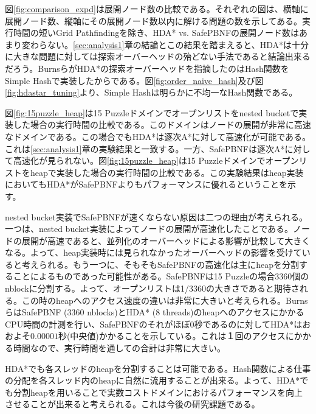 \documentclass[uplatex]{jsarticle}
\begin{document}
図\ref{fig:comparison_expd}は展開ノード数の比較である。それぞれの図は、横軸に展開ノード数、縦軸にその展開ノード数以内に解ける問題の数を示してある。実行時間の短いGrid Pathfindingを除き、HDA* vs. SafePBNFの展開ノード数はあまり変わらない。\ref{sec:analysis1}章の結論とこの結果を踏まえると、HDA*は十分に大きな問題に対しては探索オーバーヘッドの殆どない手法であると結論出来るだろう。BurnsらがHDA*の探索オーバーヘッドを指摘したのはHash関数をSimple Hashで実装したからである。図\ref{fig:order_naive_hash}及び図\ref{fig:hdastar_tuning}より、Simple Hashは明らかに不均一なHash関数である。

図\ref{fig:15puzzle_heap}は15 Puzzleドメインでオープンリストをnested bucketで実装した場合の実行時間の比較である。このドメインはノードの展開が非常に高速なドメインである。この場合でもHDA*は逐次A*に対して高速化が可能である。これは\ref{sec:analysis1}章の実験結果と一致する。一方、SafePBNFは逐次A*に対して高速化が見られない。図\ref{fig:15puzzle_heap}は15 Puzzleドメインでオープンリストをheapで実装した場合の実行時間の比較である。この実験結果はheap実装においてもHDA*がSafePBNFよりもパフォーマンスに優れるということを示す。

nested bucket実装でSafePBNFが速くならない原因は二つの理由が考えられる。一つは、nested bucket実装によってノードの展開が高速化したことである。ノードの展開が高速であると、並列化のオーバーヘッドによる影響が比較して大きくなる。よって、heap実装時には見られなかったオーバーヘッドの影響を受けていると考えられる。もう一つに、そもそもSafePBNFの高速化は主にheapを分割することによるものであった可能性がある。SafePBNFは15 Puzzleの場合3360個のnblockに分割する。よって、オープンリストは1/3360の大きさであると期待される。この時のheapへのアクセス速度の違いは非常に大きいと考えられる。BurnsらはSafePBNF (3360 nblocks)とHDA* (8 threads)のheapへのアクセスにかかるCPU時間の計測を行い、SafePBNFのそれがほぼ0秒であるのに対してHDA*はおおよそ$0.00001$秒(中央値)かかることを示している\cite{Burns2010}。これは１回のアクセスにかかる時間なので、実行時間を通しての合計は非常に大きい。

HDA*でも各スレッドのheapを分割することは可能である。Hash関数による仕事の分配を各スレッド内のheapに自然に流用することが出来る。よって、HDA*でも分割heapを用いることで実数コストドメインにおけるパフォーマンスを向上させることが出来ると考えられる。これは今後の研究課題である。


\end{document}
